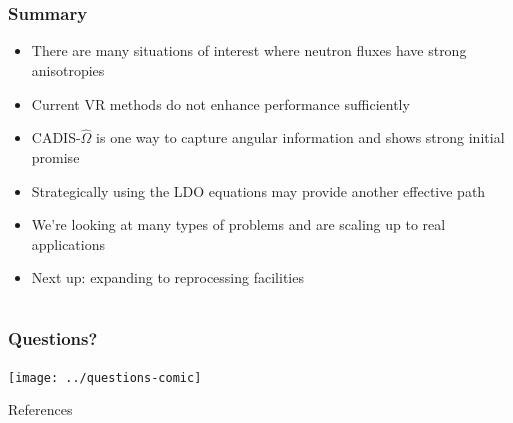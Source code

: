 \documentclass[xcolor=x11names,compress,handout]{beamer}
\renewcommand{\(}{\begin{columns}}
\renewcommand{\)}{\end{columns}}
\newcommand{\<}[1]{\begin{column}{#1}}
\renewcommand{\>}{\end{column}}
\newcommand{\vOmega}{\ensuremath{\hat{\Omega}}}
\begin{document}
\section*{}
\begin{frame}[fragile]
  \frametitle{Summary}
  \begin{itemize}
  \item There are many situations of interest where neutron fluxes have strong anisotropies
  \item Current VR methods do not enhance performance sufficiently 
  \pause
  \item CADIS-$\vOmega$ is one way to capture angular information and shows strong initial promise
  \item Strategically using the LDO equations may provide another effective path
  \pause
  \item We're looking at many types of problems and are scaling up to real applications
  \item Next up: expanding to reprocessing facilities
  \end{itemize}
\end{frame}


\section*{}
\begin{frame}[fragile]
  \frametitle{Questions?}
  \begin{center}
  \texttt{[image: ../questions-comic]}  
  \end{center}
  
\end{frame}

\begin{frame}{References}
\small
\end{frame}

%	
%	
\end{document}
